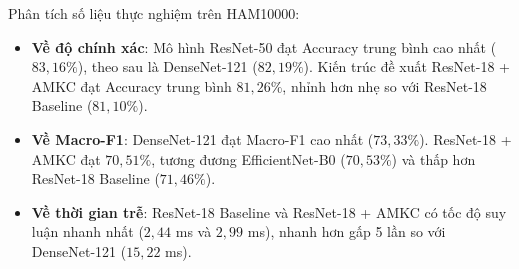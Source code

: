 \begin{table}[H]
\centering
\caption{Kết quả đối sánh các mô hình trên tập kiểm thử HAM10000 (TTA, 3 seeds: $42, 123, 2026$)}
\label{tab:ham10000_results}
\small
\setlength{\tabcolsep}{4pt}
\end{table}

Phân tích số liệu thực nghiệm trên HAM10000:
\begin{itemize}
  \item \textbf{Về độ chính xác}: Mô hình ResNet-50 đạt Accuracy trung bình cao nhất ($83{,}16\%$), theo sau là DenseNet-121 ($82{,}19\%$). Kiến trúc đề xuất ResNet-18 + AMKC đạt Accuracy trung bình $81{,}26\%$, nhỉnh hơn nhẹ so với ResNet-18 Baseline ($81{,}10\%$).
  \item \textbf{Về Macro-F1}: DenseNet-121 đạt Macro-F1 cao nhất ($73{,}33\%$). ResNet-18 + AMKC đạt $70{,}51\%$, tương đương EfficientNet-B0 ($70{,}53\%$) và thấp hơn ResNet-18 Baseline ($71{,}46\%$).
  \item \textbf{Về thời gian trễ}: ResNet-18 Baseline và ResNet-18 + AMKC có tốc độ suy luận nhanh nhất ($2{,}44$ ms và $2{,}99$ ms), nhanh hơn gấp 5 lần so với DenseNet-121 ($15{,}22$ ms).
\end{itemize}

